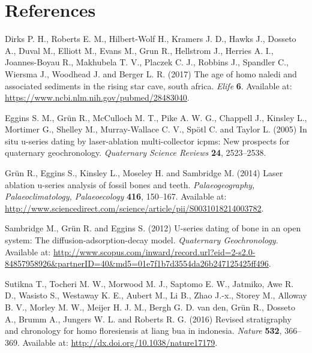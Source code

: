 \documentclass[]{article}
\begin{document}
\newpage
\nolinenumbers

\hypertarget{references}{%
\section*{References}\label{references}}

\hypertarget{refs}{}
\leavevmode\hypertarget{ref-Dirks2017}{}%
Dirks P. H., Roberts E. M., Hilbert-Wolf H., Kramers J. D., Hawks J.,
Dosseto A., Duval M., Elliott M., Evans M., Grun R., Hellstrom J.,
Herries A. I., Joannes-Boyau R., Makhubela T. V., Placzek C. J., Robbins
J., Spandler C., Wiersma J., Woodhead J. and Berger L. R. (2017) The age
of homo naledi and associated sediments in the rising star cave, south
africa. \emph{Elife} \textbf{6}. Available at:
\url{https://www.ncbi.nlm.nih.gov/pubmed/28483040}.

\leavevmode\hypertarget{ref-Eggins2005}{}%
Eggins S. M., Grün R., McCulloch M. T., Pike A. W. G., Chappell J.,
Kinsley L., Mortimer G., Shelley M., Murray-Wallace C. V., Spötl C. and
Taylor L. (2005) In situ u-series dating by laser-ablation
multi-collector icpms: New prospects for quaternary geochronology.
\emph{Quaternary Science Reviews} \textbf{24}, 2523--2538.

\leavevmode\hypertarget{ref-Gruen2014}{}%
Grün R., Eggins S., Kinsley L., Moseley H. and Sambridge M. (2014) Laser
ablation u-series analysis of fossil bones and teeth.
\emph{Palaeogeography, Palaeoclimatology, Palaeoecology} \textbf{416},
150--167. Available at:
\url{http://www.sciencedirect.com/science/article/pii/S0031018214003782}.

\leavevmode\hypertarget{ref-Sambridge2012}{}%
Sambridge M., Grün R. and Eggins S. (2012) U-series dating of bone in an
open system: The diffusion-adsorption-decay model. \emph{Quaternary
Geochronology}. Available at:
\url{http://www.scopus.com/inward/record.url?eid=2-s2.0-84857958926\&partnerID=40\&md5=01e7f1b7d3554da26b247125425ff496}.

\leavevmode\hypertarget{ref-Sutikna2016}{}%
Sutikna T., Tocheri M. W., Morwood M. J., Saptomo E. W., Jatmiko, Awe R.
D., Wasisto S., Westaway K. E., Aubert M., Li B., Zhao J.-x., Storey M.,
Alloway B. V., Morley M. W., Meijer H. J. M., Bergh G. D. van den, Grün
R., Dosseto A., Brumm A., Jungers W. L. and Roberts R. G. (2016) Revised
stratigraphy and chronology for homo floresiensis at liang bua in
indonesia. \emph{Nature} \textbf{532}, 366--369. Available at:
\url{http://dx.doi.org/10.1038/nature17179}.
\end{document}
